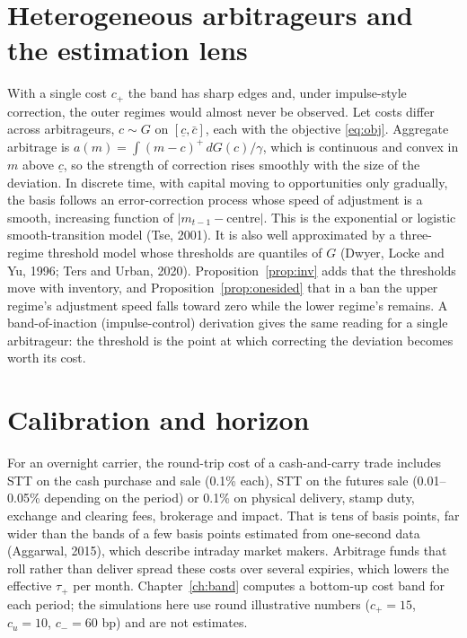 \section{Heterogeneous arbitrageurs and the estimation lens}\label{sec:het}
With a single cost $c_+$ the band has sharp edges and, under impulse-style correction, the outer regimes would almost never
be observed. Let costs differ across arbitrageurs, $c\sim G$ on $[\underline c,\bar c]$, each with the objective
\eqref{eq:obj}. Aggregate arbitrage is $a(m)=\int (m-c)^+\,dG(c)/\gamma$, which is continuous and convex in $m$ above
$\underline c$, so the strength of correction rises smoothly with the size of the deviation. In discrete time, with capital
moving to opportunities only gradually, the basis follows an error-correction process whose speed of adjustment is a
smooth, increasing function of $|m_{t-1}-\text{centre}|$. This is the exponential or logistic smooth-transition model (Tse, 2001).
It is also well approximated by a three-regime threshold model whose thresholds are quantiles of $G$ (Dwyer, Locke and Yu,
1996; Ters and Urban, 2020). Proposition~\ref{prop:inv} adds that the thresholds move with inventory, and
Proposition~\ref{prop:onesided} that in a ban the upper regime's adjustment speed falls toward zero while the lower regime's
remains. A band-of-inaction (impulse-control) derivation gives the same reading for a single arbitrageur: the threshold is
the point at which correcting the deviation becomes worth its cost.

\section{Calibration and horizon}\label{sec:cal}
For an overnight carrier, the round-trip cost of a cash-and-carry trade includes STT on the cash purchase and sale
(0.1\% each), STT on the futures sale (0.01--0.05\% depending on the period) or 0.1\% on physical delivery, stamp duty,
exchange and clearing fees, brokerage and impact. That is tens of basis points, far wider than the bands of a few
basis points estimated from one-second data (Aggarwal, 2015), which describe intraday market makers. Arbitrage funds that roll rather than deliver spread these costs over several expiries, which
lowers the effective $\tau_+$ per month. Chapter~\ref{ch:band} computes a bottom-up cost band for each period; the simulations here
use round illustrative numbers ($c_+=15$, $c_u=10$, $c_-=60$ bp) and are not estimates.

